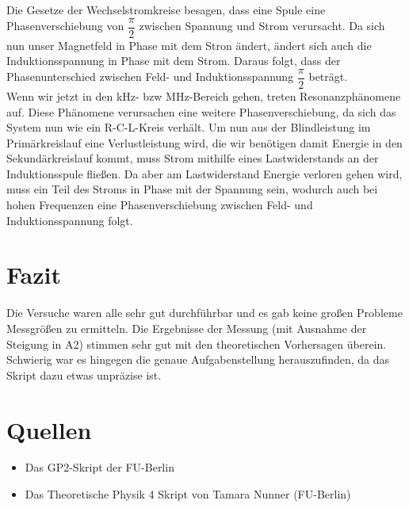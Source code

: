 \documentclass{article}
\begin{document}
Die Gesetze der Wechselstromkreise besagen, dass eine Spule eine Phasenverschiebung von $\dfrac{\pi}{2}$ zwischen Spannung und Strom verursacht. Da sich nun unser Magnetfeld in Phase mit dem Stron ändert, ändert sich auch die Induktionsspannung in Phase mit dem Strom. Daraus folgt, dass der Phasenunterschied zwischen Feld- und Induktionsspannung $\dfrac{\pi}{2}$ beträgt.\\

Wenn wir jetzt in den kHz- bzw MHz-Bereich gehen, treten Resonanzphänomene auf. Diese Phänomene verursachen eine weitere Phasenverschiebung, da sich das System nun wie ein R-C-L-Kreis verhält. Um nun aus der Blindleistung im Primärkreislauf eine Verlustleistung wird, die wir benötigen damit Energie in den Sekundärkreislauf kommt, muss Strom mithilfe eines Lastwiderstands an der Induktionsspule fließen. Da aber am Lastwiderstand Energie verloren gehen wird, muss ein Teil des Stroms in Phase mit der Spannung sein, wodurch auch bei hohen Frequenzen eine Phasenverschiebung zwischen Feld- und Induktionsspannung folgt.\\

\newpage

\section{Fazit}

Die Versuche waren alle sehr gut durchführbar und es gab keine großen Probleme Messgrößen zu ermitteln. Die Ergebnisse der Messung (mit Ausnahme der Steigung in A2) stimmen sehr gut mit den theoretischen Vorhersagen überein. Schwierig war es hingegen die genaue Aufgabenstellung herauszufinden, da das Skript dazu etwas unpräzise ist. 

\section{Quellen}
\begin{itemize}
\item Das GP2-Skript der FU-Berlin
\item Das Theoretische Physik 4 Skript von Tamara Nunner (FU-Berlin)
\end{itemize}
\end{document}
